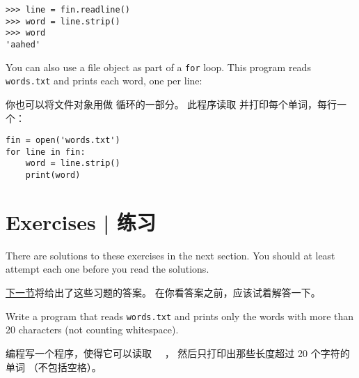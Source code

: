 \begin{lstlisting}
>>> line = fin.readline()
>>> word = line.strip()
>>> word
'aahed'
\end{lstlisting}

%
You can also use a file object as part of a {\tt for} loop.
This program reads {\tt words.txt} and prints each word, one
per line:

你也可以将文件对象用做  循环的一部分。
此程序读取  并打印每个单词，每行一个：
  

\begin{lstlisting}
fin = open('words.txt')
for line in fin:
    word = line.strip()
    print(word)
\end{lstlisting}

%

\section{Exercises  |  练习}

There are solutions to these exercises in the next section.
You should at least attempt each one before you read the solutions.

\hyperref[search]{下一节}将给出了这些习题的答案。
在你看答案之前，应该试着解答一下。

\begin{exercise}
Write a program that reads {\tt words.txt} and prints only the
words with more than 20 characters (not counting whitespace).

编程写一个程序，使得它可以读取 　， 然后只打印出那些长度超过 20 个字符的单词 （不包括空格）。

\end{exercise}

